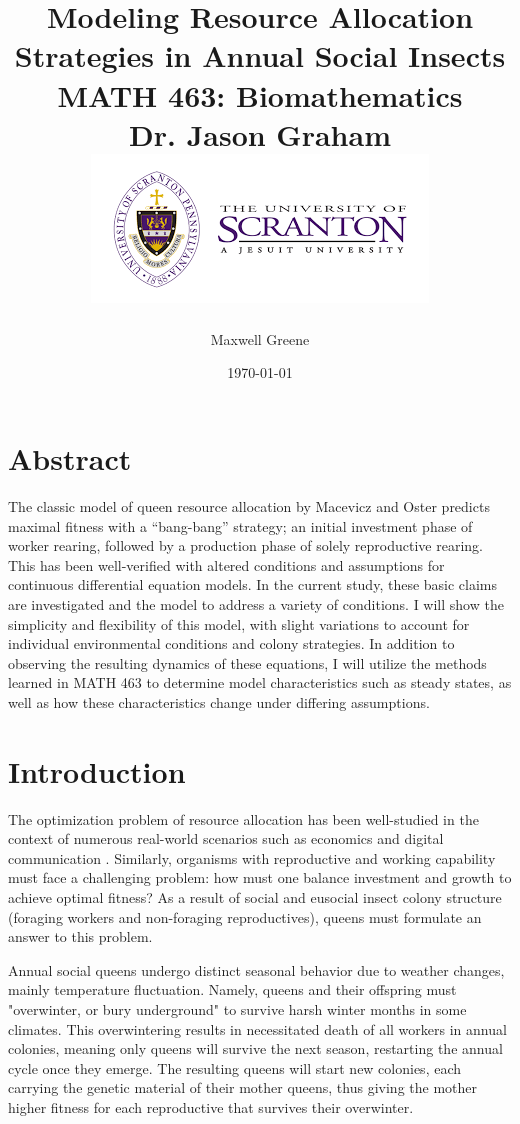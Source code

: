 \documentclass[12pt]{report}
\title
{
{Modeling Resource Allocation Strategies in Annual Social Insects}\\
{\large MATH 463: Biomathematics}\\
{\large Dr. Jason Graham} \\
{\includegraphics{university.png}}
}
\author{Maxwell Greene}
\date{\today}
\begin{document}
\maketitle

\tableofcontents
\listoffigures
{}

\chapter*{Abstract}

The classic model of queen resource allocation by Macevicz and Oster predicts maximal fitness with a “bang-bang” strategy; an initial investment phase of worker rearing, followed by a production phase of solely reproductive rearing. This has been well-verified with altered conditions and assumptions for continuous differential equation models. In the current study, these basic claims are investigated and the model to address a variety of conditions. I will show the simplicity and flexibility of this model, with slight variations to account for individual environmental conditions and colony strategies. In addition to observing the resulting dynamics of these equations, I will utilize the methods learned in MATH 463 to determine model characteristics such as steady states, as well as how these characteristics change under differing assumptions.


\chapter*{Introduction}

The optimization problem of resource allocation has been well-studied in the context of numerous real-world scenarios such as economics \cite{harberger1995monopoly} and digital communication \cite{hui1988resource}. Similarly, organisms with reproductive and working capability must face a challenging problem: how must one balance investment and growth to achieve optimal fitness? As a result of social and eusocial insect colony structure (foraging workers and non-foraging reproductives), queens must formulate an answer to this problem. 

Annual social queens undergo distinct seasonal behavior due to weather changes, mainly temperature fluctuation. Namely, queens and their offspring must "overwinter, or bury underground" to survive harsh winter months in some climates. This overwintering results in necessitated death of all workers in annual colonies, meaning only queens will survive the next season, restarting the annual cycle once they emerge. The resulting queens will start new colonies, each carrying the genetic material of their mother queens, thus giving the mother higher fitness for each reproductive that survives their overwinter.
\end{document}
